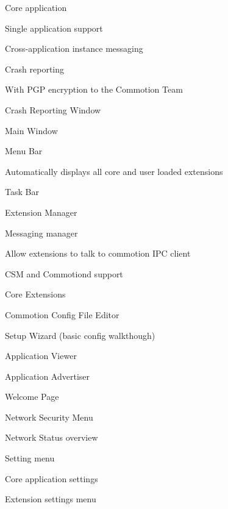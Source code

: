 \begin{DoxyItemize}
\item Core application
\begin{DoxyItemize}
\item Single application support
\item Cross-\/application instance messaging
\item Crash reporting
\item With P\-G\-P encryption to the Commotion Team
\begin{DoxyItemize}
\item Crash Reporting Window
\end{DoxyItemize}
\end{DoxyItemize}
\item Main Window
\item Menu Bar
\begin{DoxyItemize}
\item Automatically displays all core and user loaded extensions
\end{DoxyItemize}
\item Task Bar
\item Extension Manager
\item Messaging manager
\begin{DoxyItemize}
\item Allow extensions to talk to commotion I\-P\-C client
\begin{DoxyItemize}
\item C\-S\-M and Commotiond support
\end{DoxyItemize}
\end{DoxyItemize}
\item Core Extensions
\begin{DoxyItemize}
\item Commotion Config File Editor
\item Setup Wizard (basic config walkthough)
\item Application Viewer
\item Application Advertiser
\item Welcome Page
\end{DoxyItemize}
\item Network Security Menu
\item Network Status overview
\item Setting menu
\item Core application settings
\item Extension settings menu
\begin{DoxyItemize}

\end{DoxyItemize}
\end{DoxyItemize}
